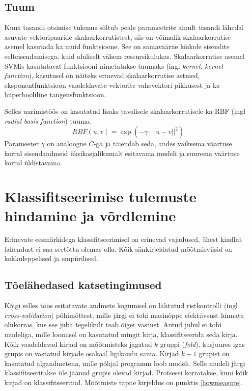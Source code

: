 \documentclass[]{trkuur}
\let\eng\emph
\begin{document}
\subsection{Tuum} 
Kuna tasandi otsimise tulemus sõltub peale parameetrite ainult tasandi lähedal
asuvate vektoripaaride skalaarkorrutistest, siis on võimalik
skalaarkorrutise asemel kasutada ka muid funktsioone. See on samaväärne kõikide sisendite
eelteisendamisega, kuid oluliselt vähem ressursikulukas.
Skalaarkorrutise asemel SVMis kasutatavat funktsiooni nimetatakse tuumaks
(ingl \eng{kernel, kernel function}),
kasutusel on näiteks erinevad skalaarkorrutise
astmed, eksponentfunktsioon vaadeldavate vektorite vahevektori pikkusest ja ka
hüperbooliline tangensfunktsioon.
\autocite{wiki-support-vector-machine}
\autocite{wiki-kernel-trick}
\autocite[89-110]{JLember2008}

Selles uurimistöös on kasutatud lisaks tavalisele skalaarkorrutisele ka RBF (ingl \eng{radial basis function}) tuuma.
\[ RBF(u,v) = \exp \left(-\gamma \cdot {||u-v||}^2 \right) \]
Parameeter \(\gamma\) on analoogne \(C\)-ga ja täiendab seda, andes
väiksema väärtuse korral sisendandmeid üksikasjalikumalt esitavama mudeli ja
suurema väärtuse korral üldistavama.
\autocite{MLkernels}

\section{Klassifitseerimise tulemuste hindamine ja võrdlemine}
Erinevate eesmärkidega klassifitseerimisel on erinevad vajadused, ühest
kindlat lahendust ei saa seetõttu olemas olla. Kõik siinkirjeldatud mõõtmisviisid
on kokkuleppelised ja empiirilised.

\subsection{Tõelähedased katsetingimused}
Kõigi selles töös esitatavate andmete kogumisel on lähtutud ristkontrolli (ingl \eng{cross-validation})
põhimõttest, mille järgi ei tohi masinõppe efektiivsust hinnata olukorras,
kus see juba tegelikult teab õiget vastust. Antud juhul ei tohi mudeliga,
mille loomisel on kasutatud mingit kirja, klassifitseerida seda kirja.
Kõik vaadeldavad kirjad on mõõtmisteks jagatud $k$ gruppi (\eng{fold}), kusjuures igas
grupis on vastatud kirjade osakaal ligikaudu sama. Kirjad $k-1$ grupist on
kasutatud algandmetena, mille põhjal programm loob mudeli. Selle mudeli järgi
klassifitseeritakse üle jäänud grupis olevad kirjad. Protsessi korratakse, kuni
kõik kirjad on klassifitseeritud.
\autocite{wikiCrossValidation}
Mõõtmiste täpne kirjeldus on punktis \ref{howmeasure}.
\end{document}
